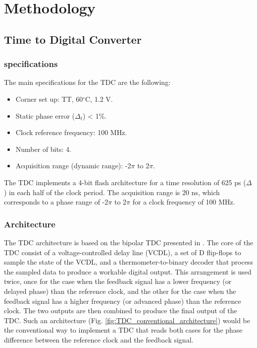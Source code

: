 \chapter{Methodology}
\section{Time to Digital Converter}

\subsection{specifications}
The main specifications for the TDC are the following:
\begin{itemize}
    \item Corner set up: TT, 60$^{\circ}$C, 1.2 V.
    \item Static phase error ($\Delta_t$) < 1\%.
    \item Clock reference frequency: 100 MHz.
    \item Number of bits: 4.
    \item Acquisition range (dynamic range): -2$\pi$ to 2$\pi$.
\end{itemize}

The TDC implements a 4-bit flash architecture for a time resolution of 625 ps ($\Delta$) in each half of the clock period. The acquisition range is 20 ns, which corresponds to a phase 
range of -2$\pi$ to 2$\pi$ for a clock frequency of 100 MHz.

\subsection{Architecture}
The TDC architecture is based on the bipolar TDC presented in \cite{Henzler2010}. The core of the TDC consist of a voltage-controlled delay line (VCDL), a set of D flip-flops to sample the
state of the VCDL, and a thermometer-to-binary decoder that process the sampled data to produce a workable digital output. This arrangement is used twice, once for the case when the
feedback signal has a lower frequency (or delayed phase) than the reference clock, and the other for the case when the feedback signal has a higher frequency (or advanced phase) than
the reference clock. The two outputs are then combined to produce the final output of the TDC. Such an architecture (Fig. \ref{fig:TDC_conventional_architecture}) would be the 
conventional way to implement a TDC that reads both cases for the phase difference between the reference clock and the feedback signal. 

